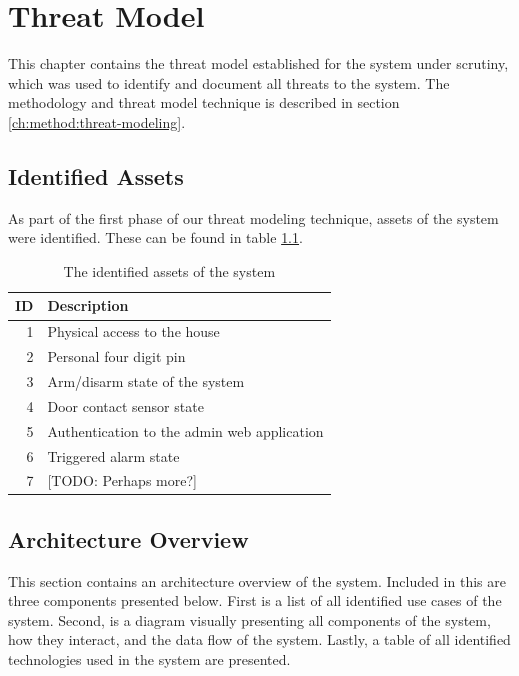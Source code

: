 \chapter{Threat Model} \label{ch:threat-model}
This chapter contains the threat model established for the system under scrutiny, which was used to identify and document all threats to the system. The methodology and threat model technique is described in section \ref{ch:method:threat-modeling}.

\section{Identified Assets}
As part of the first phase of our threat modeling technique, assets of the system were identified. These can be found in table \ref{tb:assets}.
\begin{table}[!ht]
    \centering
    \begin{tabularx}{\textwidth}{r X}
        \hline
        \textbf{ID} & \textbf{Description}
        \\ \hline
        1  & Physical access to the house
        \\
        2  & Personal four digit pin
        \\
        3  & Arm/disarm state of the system
        \\
        4  & Door contact sensor state
        \\
        5  & Authentication to the admin web application
        \\
        6  & Triggered alarm state
        \\
        7  & [TODO: Perhaps more?]
        \\ \hline
    \end{tabularx}
    \caption{The identified assets of the system}
    \label{tb:assets}
\end{table}

\section{Architecture Overview}
This section contains an architecture overview of the system. Included in this are three components presented below. First is a list of all identified use cases of the system. Second, is a diagram visually presenting all components of the system, how they interact, and the data flow of the system. Lastly, a table of all identified technologies used in the system are presented.

